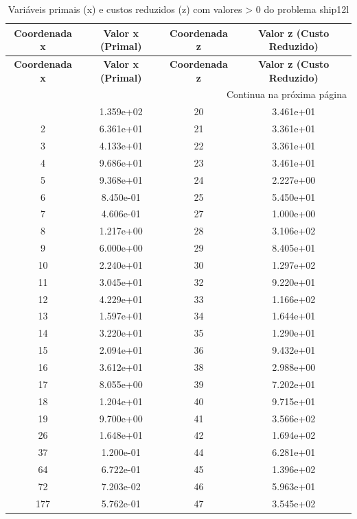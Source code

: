 \documentclass[12pt]{article}
\begin{document}
\begin{longtable}{@{}cccc@{}}
\caption{Variáveis primais (x) e custos reduzidos (z) com valores > 0 do problema ship12l} \\
\toprule
\textbf{Coordenada x} & \textbf{Valor x (Primal)} & \textbf{Coordenada z} & \textbf{Valor z (Custo Reduzido)} \\
\midrule
\endfirsthead

\toprule
\textbf{Coordenada x} & \textbf{Valor x (Primal)} & \textbf{Coordenada z} & \textbf{Valor z (Custo Reduzido)} \\
\midrule
\endhead

\midrule \multicolumn{4}{r}{{Continua na próxima página}} \\ \midrule
\endfoot

\bottomrule
\endlastfoot
1 & 1.359e+02 & 20 & 3.461e+01 \\
2 & 6.361e+01 & 21 & 3.361e+01 \\
3 & 4.133e+01 & 22 & 3.361e+01 \\
4 & 9.686e+01 & 23 & 3.461e+01 \\
5 & 9.368e+01 & 24 & 2.227e+00 \\
6 & 8.450e-01 & 25 & 5.450e+01 \\
7 & 4.606e-01 & 27 & 1.000e+00 \\
8 & 1.217e+00 & 28 & 3.106e+02 \\
9 & 6.000e+00 & 29 & 8.405e+01 \\
10 & 2.240e+01 & 30 & 1.297e+02 \\
11 & 3.045e+01 & 32 & 9.220e+01 \\
12 & 4.229e+01 & 33 & 1.166e+02 \\
13 & 1.597e+01 & 34 & 1.644e+01 \\
14 & 3.220e+01 & 35 & 1.290e+01 \\
15 & 2.094e+01 & 36 & 9.432e+01 \\
16 & 3.612e+01 & 38 & 2.988e+00 \\
17 & 8.055e+00 & 39 & 7.202e+01 \\
18 & 1.204e+01 & 40 & 9.715e+01 \\
19 & 9.700e+00 & 41 & 3.566e+02 \\
26 & 1.648e+01 & 42 & 1.694e+02 \\
37 & 1.200e-01 & 44 & 6.281e+01 \\
64 & 6.722e-01 & 45 & 1.396e+02 \\
72 & 7.203e-02 & 46 & 5.963e+01 \\
177 & 5.762e-01 & 47 & 3.545e+02 \\

\end{longtable}
\end{document}
